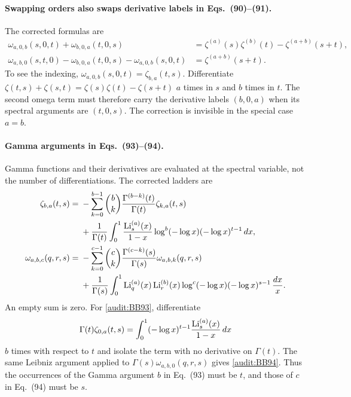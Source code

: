 \paragraph{Swapping orders also swaps derivative labels in Eqs.~(90)--(91).}
The corrected formulas are
\begin{align}
 \omega_{a,0,b}(s,0,t)+\omega_{b,0,a}(t,0,s)
 &=\zeta^{(a)}(s)\zeta^{(b)}(t)
        -\zeta^{(a+b)}(s+t),\label{audit:BB90}\\
 \omega_{a,b,0}(s,t,0)-\omega_{b,0,a}(t,0,s)
        -\omega_{a,0,b}(s,0,t)
 &=\zeta^{(a+b)}(s+t).\label{audit:BB91}
\end{align}
To see the indexing, $\omega_{a,0,b}(s,0,t)=\zeta_{b,a}(t,s)$.
Differentiate
$\zeta(t,s)+\zeta(s,t)=\zeta(s)\zeta(t)-\zeta(s+t)$
$a$ times in $s$ and $b$ times in $t$. The second omega term must
therefore carry the derivative labels $(b,0,a)$ when its spectral
arguments are $(t,0,s)$. The correction is invisible in the special
case $a=b$.

\paragraph{Gamma arguments in Eqs.~(93)--(94).}
Gamma functions and their derivatives are evaluated at the spectral
variable, not the number of differentiations. The corrected ladders are
\begin{align}
 \zeta_{b,a}(t,s)
 ={}&-\sum_{k=0}^{b-1}\binom bk
       \frac{\Gamma^{(b-k)}(t)}{\Gamma(t)}\zeta_{k,a}(t,s)\notag\\
 &+\frac1{\Gamma(t)}\int_0^1
   \frac{\operatorname{Li}_s^{(a)}(x)}{1-x}
   \log^b(-\log x)(-\log x)^{t-1}\,dx,
 \label{audit:BB93}\\
 \omega_{a,b,c}(q,r,s)
 ={}&-\sum_{k=0}^{c-1}\binom ck
       \frac{\Gamma^{(c-k)}(s)}{\Gamma(s)}\omega_{a,b,k}(q,r,s)\notag\\
 &+\frac1{\Gamma(s)}\int_0^1
   \operatorname{Li}_q^{(a)}(x)\operatorname{Li}_r^{(b)}(x)
   \log^c(-\log x)(-\log x)^{s-1}\,\frac{dx}{x}.
 \label{audit:BB94}
\end{align}
An empty sum is zero. For \eqref{audit:BB93}, differentiate
\[
 \Gamma(t)\zeta_{0,a}(t,s)
 =\int_0^1(-\log x)^{t-1}\frac{\operatorname{Li}_s^{(a)}(x)}{1-x}\,dx
\]
$b$ times with respect to $t$ and isolate the term with no derivative
on $\Gamma(t)$. The same Leibniz argument applied to
$\Gamma(s)\omega_{a,b,0}(q,r,s)$ gives \eqref{audit:BB94}.
Thus the occurrences of the Gamma argument $b$ in Eq.~(93) must be
$t$, and those of $c$ in Eq.~(94) must be $s$.

